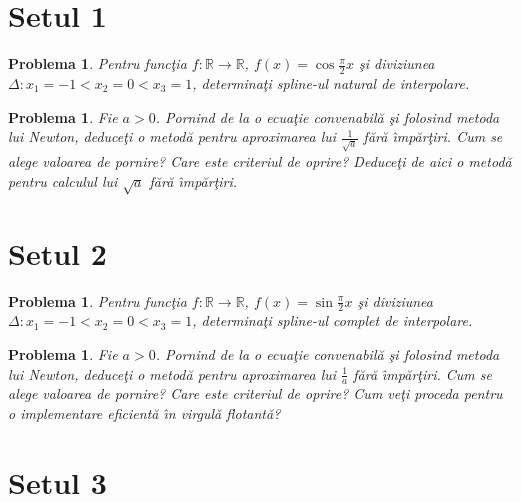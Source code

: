\documentclass{article}%
\newtheorem{problem}[theorem]{Problema}
\begin{document}
\section*{Setul 1}

\begin{problem}
Pentru func\c{t}ia $f:\mathbb{R\rightarrow R}$, $f(x)=\cos\frac{\pi}{2}x$
\c{s}i diviziunea $\Delta:x_{1}=-1<x_{2}=0<x_{3}=1$, determina\c{t}i spline-ul
natural de interpolare.
\end{problem}

\begin{problem}
Fie $a>0$. Pornind de la o ecua\c{t}ie convenabil\u{a} \c{s}i folosind metoda
lui Newton, deduce\c{t}i o metod\u{a} pentru aproximarea lui $\frac{1}%
{\sqrt{a}}$ f\u{a}r\u{a} \^{\i}mp\u{a}r\c{t}iri. Cum se alege valoarea de
pornire? Care este criteriul de oprire? Deduce\c{t}i de aici o metod\u{a}
pentru calculul lui $\sqrt{a}$ f\u{a}r\u{a} \^{\i}mp\u{a}r\c{t}iri.
\end{problem}

\vspace{3cm}

\section*{Setul 2}

\begin{problem}
Pentru func\c{t}ia $f:\mathbb{R\rightarrow R}$, $f(x)=\sin\frac{\pi}{2}x$
\c{s}i diviziunea $\Delta:x_{1}=-1<x_{2}=0<x_{3}=1$, determina\c{t}i spline-ul
complet de interpolare.
\end{problem}

\begin{problem}
Fie $a>0$. Pornind de la o ecua\c{t}ie convenabil\u{a} \c{s}i folosind metoda
lui Newton, deduce\c{t}i o metod\u{a} pentru aproximarea lui $\frac{1}{a}$
f\u{a}r\u{a} \^{\i}mp\u{a}r\c{t}iri. Cum se alege valoarea de pornire? Care
este criteriul de oprire? Cum ve\c{t}i proceda pentru o implementare
eficient\u{a} \^{\i}n virgul\u{a} flotant\u{a}?
\end{problem}

\newpage

\section*{Setul 3}
\end{document}
